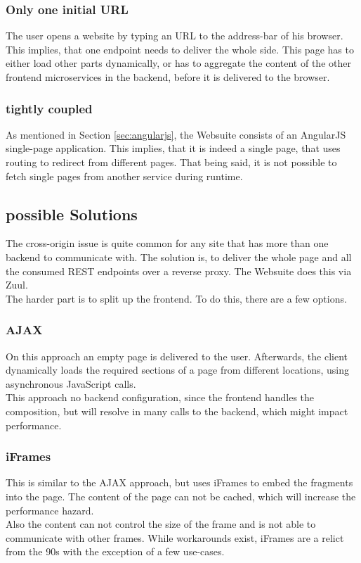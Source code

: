 \subsubsection{Only one initial URL}
The user opens a website by typing an URL to the address-bar of his browser. This implies, that one endpoint needs to deliver the whole side. This page has to either load other parts dynamically, or has to aggregate the content of the other frontend microservices in the backend, before it is delivered to the browser.

\subsubsection{tightly coupled}
As mentioned in Section \ref{sec:angularjs}, the Websuite consists of an AngularJS single-page application. This implies, that it is indeed a single page, that uses routing to redirect from different pages. That being said, it is not possible to fetch single pages from another service during runtime.

\subsection{possible Solutions}
The cross-origin issue is quite common for any site that has more than one backend to communicate with. The solution is, to deliver the whole page and all the consumed REST endpoints over a reverse proxy. The Websuite does this via Zuul.\\
The harder part is to split up the frontend. To do this, there are a few options.

\subsubsection{AJAX}
On this approach an empty page is delivered to the user. Afterwards, the client dynamically loads the required sections of a page from different locations, using asynchronous JavaScript calls.\\
This approach no backend configuration, since the frontend handles the composition, but will resolve in many calls to the backend, which might impact performance.

\subsubsection{iFrames}
This is similar to the AJAX approach, but uses iFrames to embed the fragments into the page. The content of the page can not be cached, which will increase the performance hazard.\\
Also the content can not control the size of the frame and is not able to communicate with other frames. While workarounds exist, iFrames are a relict from the 90s with the exception of a few use-cases.

